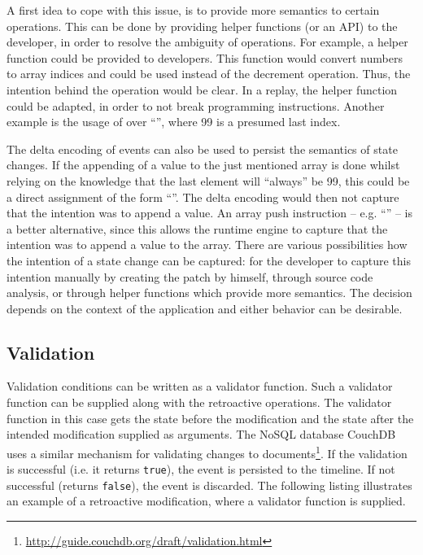 A first idea to cope with this issue, is to provide more semantics to certain operations. 
This can be done by providing helper functions (or an API) to the developer, in order to 
resolve the ambiguity of operations.
For example, a helper function \mbox{} could be provided to
developers. This function would convert numbers to array indices and
could be used instead of the decrement operation.
Thus, the intention behind the operation would be clear. In a replay, the
helper function could be adapted, in order to not break programming instructions.
Another example is the usage of  over ``'',
where 99 is a presumed last index. 

The delta encoding of events can also be used to persist the semantics of state changes.
If the appending of a value to the just mentioned array is done whilst relying on 
the knowledge that the last element will ``always'' be 99, this could be a direct 
assignment of the form ``''.
The delta encoding would then not capture that the intention was to append a value. 
An array push instruction -- e.g. ``'' -- is a better 
alternative, since this allows the runtime engine to capture that the intention was 
to append a value to the array.
There are various possibilities how the intention of a state change can be captured: 
for the developer to capture this intention manually by creating the patch by himself, 
through source code analysis, or through helper functions which provide more semantics.
The decision depends on the context of the application and either behavior can be desirable.


\subsection{Validation}
\label{sec:programming-validation}
Validation conditions can be written as a validator function. Such a validator 
function can be supplied along with the retroactive operations. 
The validator function in this case gets the state before the modification
and the state after the intended modification supplied as arguments.
The NoSQL database CouchDB uses a similar mechanism for validating changes
to documents\footnote[1]{\href{http://guide.couchdb.org/draft/validation.html}{http://guide.couchdb.org/draft/validation.html}}.
If the validation is successful (i.e. it returns \texttt{true}), the event is 
persisted to the timeline. If not successful (returns \texttt{false}), the event 
is discarded. The following listing illustrates an example of a retroactive
modification, where a validator function is supplied.

